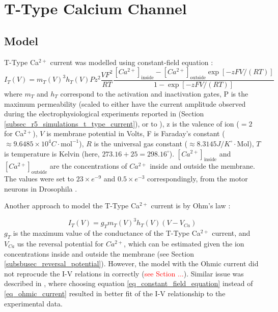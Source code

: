 \documentclass[../../workflow.tex]{subfiles}
\begin{document}
\section{T-Type Calcium Channel}
\etocignoretoctocdepth %
\etocsettocstyle{\subsection*{\contentsname}}{}
\localtableofcontents

\subsection{Model}

T-Type Ca$^{2+}$ current was modelled using constant-field equation \cite{huguenardSimulationCurrentsInvolved1992}:
\begin{equation}\label{eq_constant_field_equation}
    I_T(V) = m_T(V)^3 h_T(V) P z^2 \frac{VF^2}{RT}\frac{[Ca^{2+}]_{\text{inside}} - [Ca^{2+}]_{\text{outside}} \exp{[-zFV/(RT)]} }{1 - \exp{[-zFV/(RT)]}}
\end{equation}
where $m_T$ and $h_T$ correspond to the activation and inactivation gates,
P is the maximum permeability (scaled to either have the current amplitude observed
during the electrophysiological experiments reported in \cite{jeongCaa1TFlyTtype2015}
(Section \ref{subsec_r5_simulations_t_type_current}), or to ), z is the valence of ion ($=2$ for Ca$^{2+}$),
$V$ is membrane potential in Volts, F is Faraday's constant ($\approx 9.6485 \times 10^{4} C\cdot \text{mol}^{-1}$),
$R$ is the universal gas constant
($\approx 8.3145 J/K^\circ \cdot \text{Mol}$), $T$ is temperature is Kelvin (here, $273.16+25=298.16^{\circ}$).
$[Ca^{2+}]_{\text{inside}}$ and $[Ca^{2+}]_{\text{outside}}$ are the concentrations of $Ca^{2+}$ inside and
outside the membrane. The values were set to $23 \times e^{-9}$ and $0.5 \times e^{-3}$ correspondingly,
from the motor neurons in Drosophila
\cite{frankenhaeuserActionCalciumElectrical1957}.

Another approach to model the T-Type Ca$^{2+}$ current is by Ohm's law \cite{huguenardSimulationCurrentsInvolved1992, 
wangModelTtypeCalcium1991}:

\begin{equation}\label{eq_ohmic_current}
    I_T(V) = g_T m_T(V)^3 h_T(V) (V - V_{Ca})
\end{equation}
$g_T$ is the maximum value of the conductance of the T-Type
Ca$^{2+}$ current, and $V_{Ca}$ us the reversal potential for $Ca^{2+}$, which can be estimated
given the ion concentrations inside and outside the membrane (see Section \ref{subsbusec_reversal_potential}).
However, the model with the Ohmic current did not reprocude the I-V relations
in \cite{jeongCaa1TFlyTtype2015} correctly (\textcolor{red}{see Sction ...}).
Similar issue was described in \cite{huguenardSimulationCurrentsInvolved1992}, where choosing
equation \ref{eq_constant_field_equation} instead of \ref{eq_ohmic_current} resulted in better
fit of the I-V relationship to the experimental data.
\end{document}
